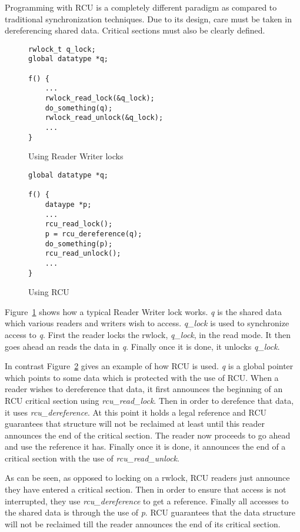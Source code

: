Programming with RCU is a completely different paradigm as compared to traditional
synchronization techniques. Due to its design, care must be taken in dereferencing
shared data. Critical sections must also be clearly defined.


\begin{figure}[h]
\centering
\begin{lstlisting}
rwlock_t q_lock;
global datatype *q;

f() {
	...
	rwlock_read_lock(&q_lock);
	do_something(q);
	rwlock_read_unlock(&q_lock);
	...
}
\end{lstlisting}
\caption{Using Reader Writer locks}\label{fig:rwuse}
\end{figure}

\begin{figure}[h]
\centering
\begin{lstlisting}
global datatype *q;

f() {
	dataype *p;
	...
	rcu_read_lock();
	p = rcu_dereference(q);
	do_something(p);
	rcu_read_unlock();
	...
}
\end{lstlisting}
\caption{Using RCU}\label{fig:RCUuse}
\end{figure}

Figure~\ref{fig:rwuse} shows how a
typical Reader Writer lock works. \emph{q} is the shared data which various readers
and writers wish to access. \emph{q\_lock} is used to synchronize access to \emph{q}.
First the reader locks the rwlock, \emph{q\_lock},
in the read mode. It then goes ahead an reads the data in \emph{q}. Finally once it is
done, it unlocks \emph{q\_lock}.

In contrast Figure~\ref{fig:RCUuse} gives an example of how RCU is used. \emph{q} is a global pointer
which points to some data which is protected with the use of RCU. When a reader
wishes to dereference that data, it first announces the beginning of an RCU critical
section using \emph{rcu\_read\_lock}. Then in order to derefence that data, it 
uses \emph{rcu\_dereference}. At this
point it holds a legal reference and RCU guarantees that structure will not be
reclaimed at least until this reader announces the end of the critical section.
The reader now proceeds to go ahead and use the reference it has. Finally once it
is done, it announces the end of a critical section with the use of \emph{rcu\_read\_unlock}.

As can be seen, as opposed to locking on a rwlock, RCU readers just announce they
have entered a critical section. Then in order to ensure that access is not
interrupted, they use \emph{rcu\_dereference} to get a reference. Finally all accesses
to the shared data is through the use of \emph{p}. RCU guarantees that the data structure
will not be reclaimed till the reader announces the end of its critical section.


